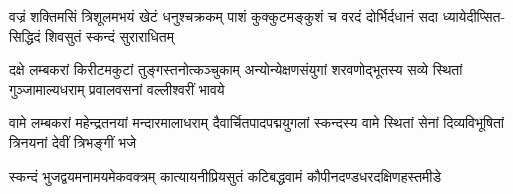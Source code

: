 {वज्रं शक्तिमसिं त्रिशूलमभयं खेटं धनुश्चक्रकम्}
{पाशं कुक्कुटमङ्कुशं च वरदं दोर्भिर्दधानं सदा}
{ध्यायेदीप्सित-सिद्धिदं शिवसुतं स्कन्दं सुराराधितम्}

{दक्षे लम्बकरां किरीटमकुटां तुङ्गस्तनोत्कञ्चुकाम्}
{अन्योन्येक्षणसंयुगां शरवणोद्भूतस्य सव्ये स्थितां}
{गुञ्जामाल्यधराम् प्रवालवसनां वल्लीश्वरीं भावये}

{वामे लम्बकरां महेन्द्रतनयां मन्दारमालाधराम्}
{दैवार्चितपादपद्मयुगलां स्कन्दस्य वामे स्थितां}
{सेनां दिव्यविभूषितां त्रिनयनां देवीं त्रिभङ्गीं भजे}

{स्कन्दं भुजद्वयमनामयमेकवक्त्रम्}
{कात्यायनीप्रियसुतं कटिबद्धवामं}
{कौपीनदण्डधरदक्षिणहस्तमीडे}
\closesection
